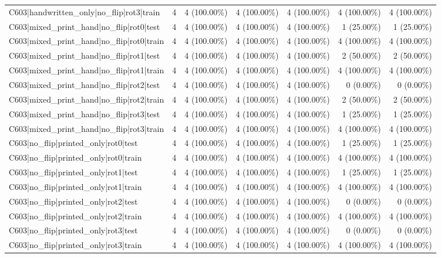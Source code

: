 \begin{longtable}{>{\raggedright\arraybackslash}p{5cm}rrrrrr}
C603|handwritten\_only|no\_flip|rot3|train & 4 & 4 (100.00\%) & 4 (100.00\%) & 4 (100.00\%) & 4 (100.00\%) & 4 (100.00\%) \\
C603|mixed\_print\_hand|no\_flip|rot0|test & 4 & 4 (100.00\%) & 4 (100.00\%) & 4 (100.00\%) & 1 (25.00\%) & 1 (25.00\%) \\
C603|mixed\_print\_hand|no\_flip|rot0|train & 4 & 4 (100.00\%) & 4 (100.00\%) & 4 (100.00\%) & 4 (100.00\%) & 4 (100.00\%) \\
C603|mixed\_print\_hand|no\_flip|rot1|test & 4 & 4 (100.00\%) & 4 (100.00\%) & 4 (100.00\%) & 2 (50.00\%) & 2 (50.00\%) \\
C603|mixed\_print\_hand|no\_flip|rot1|train & 4 & 4 (100.00\%) & 4 (100.00\%) & 4 (100.00\%) & 4 (100.00\%) & 4 (100.00\%) \\
C603|mixed\_print\_hand|no\_flip|rot2|test & 4 & 4 (100.00\%) & 4 (100.00\%) & 4 (100.00\%) & 0 (0.00\%) & 0 (0.00\%) \\
C603|mixed\_print\_hand|no\_flip|rot2|train & 4 & 4 (100.00\%) & 4 (100.00\%) & 4 (100.00\%) & 2 (50.00\%) & 2 (50.00\%) \\
C603|mixed\_print\_hand|no\_flip|rot3|test & 4 & 4 (100.00\%) & 4 (100.00\%) & 4 (100.00\%) & 1 (25.00\%) & 1 (25.00\%) \\
C603|mixed\_print\_hand|no\_flip|rot3|train & 4 & 4 (100.00\%) & 4 (100.00\%) & 4 (100.00\%) & 4 (100.00\%) & 4 (100.00\%) \\
C603|no\_flip|printed\_only|rot0|test & 4 & 4 (100.00\%) & 4 (100.00\%) & 4 (100.00\%) & 1 (25.00\%) & 1 (25.00\%) \\
C603|no\_flip|printed\_only|rot0|train & 4 & 4 (100.00\%) & 4 (100.00\%) & 4 (100.00\%) & 4 (100.00\%) & 4 (100.00\%) \\
C603|no\_flip|printed\_only|rot1|test & 4 & 4 (100.00\%) & 4 (100.00\%) & 4 (100.00\%) & 1 (25.00\%) & 1 (25.00\%) \\
C603|no\_flip|printed\_only|rot1|train & 4 & 4 (100.00\%) & 4 (100.00\%) & 4 (100.00\%) & 4 (100.00\%) & 4 (100.00\%) \\
C603|no\_flip|printed\_only|rot2|test & 4 & 4 (100.00\%) & 4 (100.00\%) & 4 (100.00\%) & 0 (0.00\%) & 0 (0.00\%) \\
C603|no\_flip|printed\_only|rot2|train & 4 & 4 (100.00\%) & 4 (100.00\%) & 4 (100.00\%) & 4 (100.00\%) & 4 (100.00\%) \\
C603|no\_flip|printed\_only|rot3|test & 4 & 4 (100.00\%) & 4 (100.00\%) & 4 (100.00\%) & 0 (0.00\%) & 0 (0.00\%) \\
C603|no\_flip|printed\_only|rot3|train & 4 & 4 (100.00\%) & 4 (100.00\%) & 4 (100.00\%) & 4 (100.00\%) & 4 (100.00\%) \\

\end{longtable}
